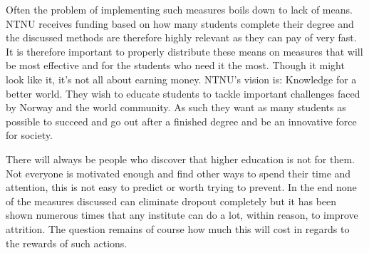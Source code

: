 \bigskip\noindent
Often the problem of implementing such measures boils down to lack of means.
NTNU receives funding based on how many students complete their degree and the discussed methods are therefore highly relevant as they can pay of very fast.
It is therefore important to properly distribute these means on measures that will be most effective and for the students who need it the most.
Though it might look like it, it's not all about earning money.
NTNU's vision is: Knowledge for a better world.
They wish to educate students to tackle important challenges faced by Norway and the world community.
As such they want as many students as possible to succeed and go out after a finished degree and be an innovative force for society. 

\bigskip\noindent
There will always be people who discover that higher education is not for them.
Not everyone is motivated enough and find other ways to spend their time and attention, this is not easy to predict or worth trying to prevent.
In the end none of the measures discussed can eliminate dropout completely but it has been shown numerous times that any institute can do a lot, within reason, to improve attrition. 
The question remains of course how much this will cost in regards to the rewards of such actions.
